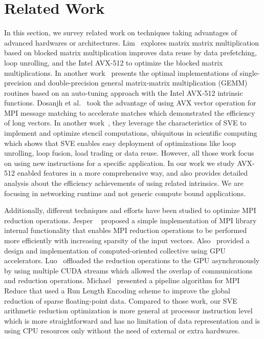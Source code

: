 \documentclass[sigconf]{acmart}
\newcommand{\mpi}[0]{\textsc{MPI}\xspace}
\newcommand{\sve}[0]{\textsc{SVE}\xspace}
\begin{document}
\section{Related Work}\label{sec:related}
In this section, we survey related work on techniques taking advantages of
advanced hardwares or architectures.
%
Lim~\cite{Lim2018} explores matrix matrix multiplication based on blocked matrix multiplication
improves data reuse by data prefetching, loop unrolling, and the Intel AVX-512 to optimize the blocked matrix multiplications.
%
In another work~\cite{Kim19} presents the optimal implementations of single-precision and double-precision general matrix-matrix multiplication (GEMM) routines based on an auto-tuning approach with the Intel AVX-512 intrinsic functions.
%
Dosanjh et al.~\cite{tag-match} took the advantage of using AVX vector operation for
MPI message matching to accelerate matches which demonstrated the efficiency
of long vectors.
%
In another work~\cite{sve-stencil}, they leverage the characteristics of \sve to implement and optimize
stencil computations, ubiquitous in scientific computing which shows
that \sve enables easy deployment of optimizations like loop unrolling,
loop fusion, load trading or data reuse. However, all those work focus on using new instructions
for a specific application.
In our work we study AVX-512 enabled features in a more comprehensive way, and also provides
detailed analysis about the efficiency achievements of using related intrinsics.
We are focusing in networking runtime and not generic compute bound applications.

Additionally, different techniques and
efforts have been studied to optimize \mpi reduction operations. Jesper
~\cite{Neutral_MPI_Reduction} proposed a simple implementation of MPI library
internal functionality that enables MPI reduction operations to be performed
more efficiently with increasing sparsity of the input vectors. Also~\cite{gpu-reduce,Luo-adapt}
provided a design and implementation of computed-oriented collective using GPU accelerators.
Luo~\cite{Luo-adapt} offloaded the reduction operations to the GPU asynchronously by
using multiple CUDA streams which allowed the overlap of communications and reduction operations.
Michael~\cite{sparse-reduction} presented a pipeline algorithm for MPI Reduce
that used a Run Length Encoding scheme to improve the global reduction of sparse
floating-point data. Compared to those work, our \sve arithmetic reduction
optimization is more general at processor instruction level which  is more
straightforward and has no limitation of data representation and is using CPU resources only
without the need of external or extra hardwares.
\end{document}
